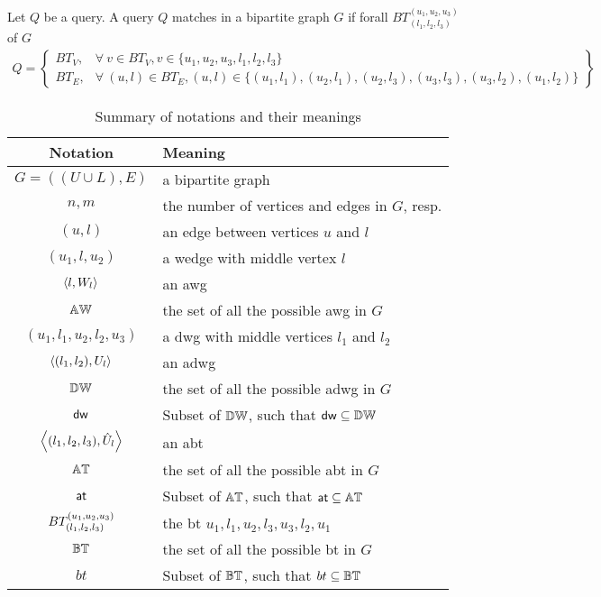 \begin{definition}\label{def:query:match}
Let $Q$ be a query.
A query $Q$ matches in a bipartite graph $G$ if forall $BT_{(l_1,l_2,l_3)}^{(u_1,u_2,u_3)}$ of $G$
\footnotesize\begin{align*}
    Q = \left\{\begin{array}{lr}
    BT_V, & \forall\ v \in BT_V, v \in \{u_1,u_2,u_3,l_1,l_2,l_3\}\\
    BT_E, & \forall\ (u,l) \in BT_E, (u,l) \in \{(u_1, l_1), (u_2,l_1), (u_2, l_3), (u_3,l_3), (u_3, l_2), (u_1,l_2)\} 
    \end{array}\right\} 
    \end{align*}
\end{definition}

\begin{table}[!ht]
\centering
\begin{tabular}{|c|l|} \hline
\textbf{Notation} & \textbf{Meaning}\\ \hline
$G=((U\cup L),E)$ & a bipartite graph\\  \hline
$n,m$ & the number of vertices and edges in $G$, resp.\\  \hline
$(u,l)$ & an edge between vertices $u$ and $l$\\  \hline
$(u_1,l,u_2)$ & a wedge with  middle vertex $l$\\  \hline
$\left\langle l, W_l \right\rangle$ & an \acrshort{awg}\\  \hline
$\mathbb{AW}$ & the set of all the possible \acrshort{awg} in $G$\\  \hline
$(u_1,l_1,u_2,l_2,u_3)$ & a \acrshort{dwg} with middle vertices $l_1$ and $l_2$\\  \hline 
$\left\langle (l_1, l_2), U_l \right\rangle$ & an \acrshort{adwg}\\  \hline
$\mathbb{DW}$ & the set of all the possible \acrshort{adwg} in $G$\\  \hline
$\mathsf{dw}$ & Subset of $\mathbb{DW}$, such that $\mathsf{dw} \subseteq \mathbb{DW}$ \\  \hline
$\left\langle (l_1, l_2,l_3), \hat{U}_l \right\rangle$ & an \acrshort{abt}\\  \hline
$\mathbb{AT}$ & the set of all the possible \acrshort{abt} in $G$ \\  \hline
$\mathsf{at}$ & Subset of $\mathbb{AT}$, such that $\mathsf{at} \subseteq \mathbb{AT}$ \\  \hline 
$BT_{(l_1, l_2,l_3)}^{(u_1, u_2, u_3)}$ & the \acrshort{bt} $u_1,l_1,u_2,l_3,u_3,l_2,u_1$\\  \hline
$\mathbb{BT}$ & the set of all the possible \acrshort{bt} in $G$ \\  \hline
$bt$ & Subset of $\mathbb{BT}$, such that $bt \subseteq \mathbb{BT}$ \\  \hline
\end{tabular}
\caption{Summary of notations and their meanings}
\label{table:notation}
\end{table}
      

